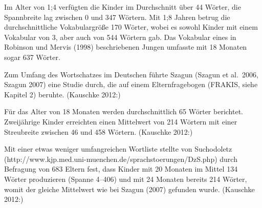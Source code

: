 \documentclass[
  letterpaper,
]{scrbook}
\begin{document}
\begin{tcolorbox}[enhanced jigsaw, bottomrule=.15mm, colback=white, arc=.35mm, opacityback=0, colframe=quarto-callout-note-color-frame, rightrule=.15mm, leftrule=.75mm, breakable, toprule=.15mm, left=2mm]
\begin{minipage}[t]{5.5mm}
\textcolor{quarto-callout-note-color}{\faInfo}
\end{minipage}%
\begin{minipage}[t]{\textwidth - 5.5mm}

Im Alter von 1;4 verfügten die Kinder im Durchschnitt über 44 Wörter,
die Spannbreite lag zwischen 0 und 347 Wörtern. Mit 1;8 Jahren betrug
die durchschnittliche Vokabulargröße 170 Wörter, wobei es sowohl Kinder
mit einem Vokabular von 3, aber auch von 544 Wörtern gab. Das Vokabular
eines in Robinson und Mervis (1998) beschriebenen Jungen umfasste mit 18
Monaten sogar 637 Wörter.

\end{minipage}%
\end{tcolorbox}

\begin{tcolorbox}[enhanced jigsaw, bottomrule=.15mm, colback=white, arc=.35mm, opacityback=0, colframe=quarto-callout-note-color-frame, rightrule=.15mm, leftrule=.75mm, breakable, toprule=.15mm, left=2mm]
\begin{minipage}[t]{5.5mm}
\textcolor{quarto-callout-note-color}{\faInfo}
\end{minipage}%
\begin{minipage}[t]{\textwidth - 5.5mm}

Zum Umfang des Wortschatzes im Deutschen führte Szagun (Szagun et
al.~2006, Szagun 2007) eine Studie durch, die auf einem Elternfragebogen
(FRAKIS, siehe Kapitel 2) beruhte. (Kauschke 2012:)

Für das Alter von 18 Monaten werden durchschnittlich 65 Wörter
berichtet. Zweijährige Kinder erreichten einen Mittelwert von 214
Wörtern mit einer Streubreite zwischen 46 und 458 Wörtern. (Kauschke
2012:)

\end{minipage}%
\end{tcolorbox}

\begin{tcolorbox}[enhanced jigsaw, bottomrule=.15mm, colback=white, arc=.35mm, opacityback=0, colframe=quarto-callout-note-color-frame, rightrule=.15mm, leftrule=.75mm, breakable, toprule=.15mm, left=2mm]
\begin{minipage}[t]{5.5mm}
\textcolor{quarto-callout-note-color}{\faInfo}
\end{minipage}%
\begin{minipage}[t]{\textwidth - 5.5mm}

Mit einer etwas weniger umfangreichen Wortliste stellte von Suchodoletz
(http://www.kjp.med.uni-muenchen.de/sprachstoerungen/DzS.php) durch
Befragung von 683 Eltern fest, dass Kinder mit 20 Monaten im Mittel 134
Wörter produzieren (Spanne 4--406) und mit 24 Monaten bereits 214
Wörter, womit der gleiche Mittelwert wie bei Szagun (2007) gefunden
wurde. (Kauschke 2012:)

\end{minipage}%
\end{tcolorbox}
\end{document}
